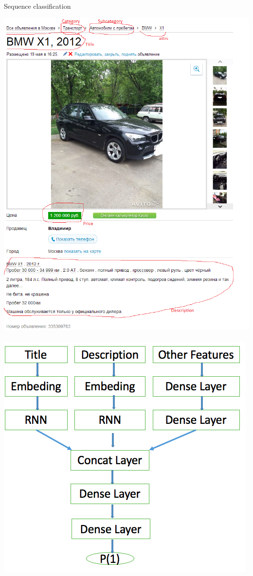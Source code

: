 \documentclass{beamer}
\begin{document}
\begin{frame}{Sequence classification}
\begin{center}
		
		 \includegraphics[scale=0.2]{./img/avito} ~~  \includegraphics[scale=0.3]{./img/clf}
	\end{center}
\end{frame}
\end{document}
